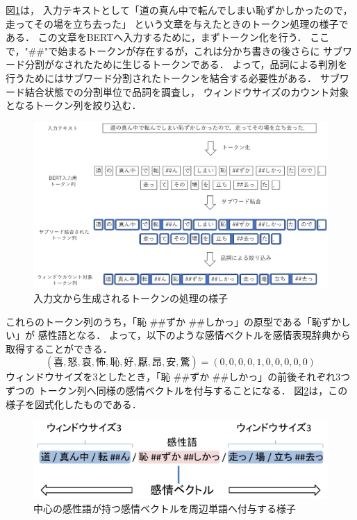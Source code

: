 			図\ref{fig:token_processing}は，
			入力テキストとして「道の真ん中で転んでしまい恥ずかしかったので，走ってその場を立ち去った」
			という文章を与えたときのトークン処理の様子である．
			この文章をBERTへ入力するために，まずトークン化を行う．
			ここで，"\#\#"で始まるトークンが存在するが，これは分かち書きの後さらに
			サブワード分割がなされたために生じるトークンである．
			よって，品詞による判別を行うためにはサブワード分割されたトークンを結合する必要性がある．
			サブワード結合状態での分割単位で品詞を調査し，
			ウィンドウサイズのカウント対象となるトークン列を絞り込む．
			\begin{figure}[H]
				\centering
				\includegraphics[width=\linewidth]{./figure/token_processing.png}
				\caption{入力文から生成されるトークンの処理の様子}
				\label{fig:token_processing}
			\end{figure}
			これらのトークン列のうち，「恥 \#\#ずか \#\#しかっ」の原型である「恥ずかしい」が
			感性語となる．
			よって，以下のような感情ベクトルを感情表現辞典から取得することができる．
			$$(喜, 怒, 哀, 怖, 恥, 好, 厭, 昂, 安, 驚)=(0, 0, 0, 0, 1, 0, 0, 0, 0, 0)$$
			ウィンドウサイズを3としたとき，「恥 \#\#ずか \#\#しかっ」の前後それぞれ3つずつの
			トークン列へ同様の感情ベクトルを付与することになる．
			図\ref{fig:make_dataset_window}は，この様子を図式化したものである．
			\begin{figure}[H]
				\centering
				\includegraphics[width=\linewidth]{./figure/dataset_make_window.png}
				\caption{中心の感性語が持つ感情ベクトルを周辺単語へ付与する様子}
				\label{fig:make_dataset_window}
			\end{figure}


